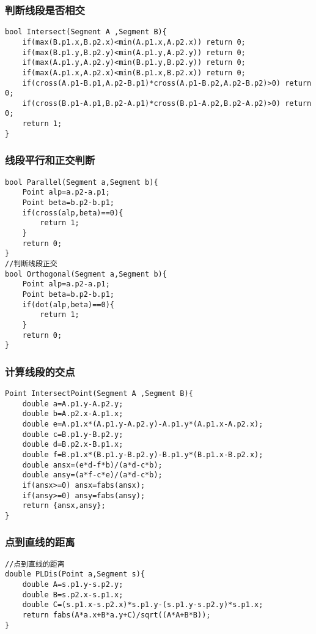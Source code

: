 \documentclass[twocolumn,a4]{article}
\begin{document}
\subsubsection{判断线段是否相交}
\begin{lstlisting}
bool Intersect(Segment A ,Segment B){
    if(max(B.p1.x,B.p2.x)<min(A.p1.x,A.p2.x)) return 0;
    if(max(B.p1.y,B.p2.y)<min(A.p1.y,A.p2.y)) return 0;
    if(max(A.p1.y,A.p2.y)<min(B.p1.y,B.p2.y)) return 0;
    if(max(A.p1.x,A.p2.x)<min(B.p1.x,B.p2.x)) return 0;
    if(cross(A.p1-B.p1,A.p2-B.p1)*cross(A.p1-B.p2,A.p2-B.p2)>0) return 0;
    if(cross(B.p1-A.p1,B.p2-A.p1)*cross(B.p1-A.p2,B.p2-A.p2)>0) return 0;
    return 1;
}
\end{lstlisting}
\subsubsection{线段平行和正交判断}
\begin{lstlisting}
bool Parallel(Segment a,Segment b){
    Point alp=a.p2-a.p1;
    Point beta=b.p2-b.p1;
    if(cross(alp,beta)==0){
        return 1;
    }
    return 0;
}
//判断线段正交
bool Orthogonal(Segment a,Segment b){
    Point alp=a.p2-a.p1;
    Point beta=b.p2-b.p1;
    if(dot(alp,beta)==0){
        return 1;
    }
    return 0;   
}
\end{lstlisting}
\subsubsection{计算线段的交点}
\begin{lstlisting}
Point IntersectPoint(Segment A ,Segment B){
    double a=A.p1.y-A.p2.y;
    double b=A.p2.x-A.p1.x;
    double e=A.p1.x*(A.p1.y-A.p2.y)-A.p1.y*(A.p1.x-A.p2.x);
    double c=B.p1.y-B.p2.y;
    double d=B.p2.x-B.p1.x;
    double f=B.p1.x*(B.p1.y-B.p2.y)-B.p1.y*(B.p1.x-B.p2.x);
    double ansx=(e*d-f*b)/(a*d-c*b);
    double ansy=(a*f-c*e)/(a*d-c*b);
    if(ansx>=0) ansx=fabs(ansx);
    if(ansy>=0) ansy=fabs(ansy);
    return {ansx,ansy};  
}
\end{lstlisting}
\subsubsection{点到直线的距离}
\begin{lstlisting}
//点到直线的距离
double PLDis(Point a,Segment s){
    double A=s.p1.y-s.p2.y;
    double B=s.p2.x-s.p1.x;
    double C=(s.p1.x-s.p2.x)*s.p1.y-(s.p1.y-s.p2.y)*s.p1.x;
    return fabs(A*a.x+B*a.y+C)/sqrt((A*A+B*B));
}
\end{lstlisting}
\end{document}
